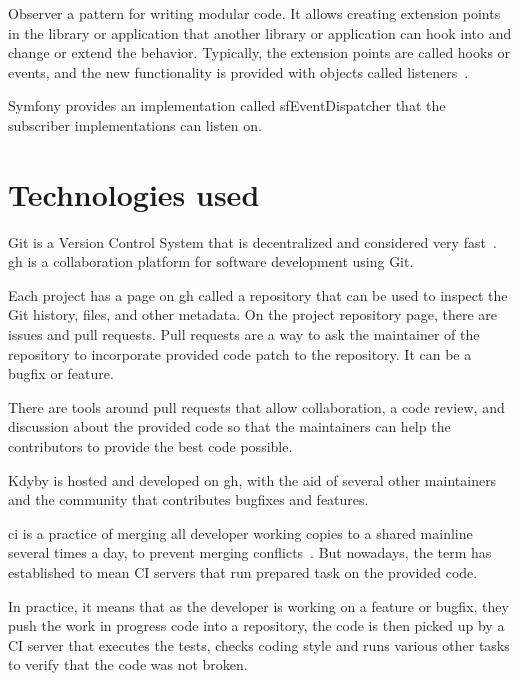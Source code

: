  \label{sec:theory:observer-pattern}

Observer a pattern for writing modular code. It allows creating extension points in the library or application that another library or application can hook into and change or extend the behavior. Typically, the extension points are called hooks or events, and the new functionality is provided with objects called listeners~\cite{vlissides1995design}.

Symfony provides an implementation called \gls{sfEventDispatcher} that the subscriber implementations can listen on.

\section{Technologies used}

 \label{sec:theory:git}

Git is a Version Control System that is decentralized and considered very fast~\cite{progit}. \gls{gh} is a collaboration platform for software development using Git.

Each project has a page on \gls{gh} called a repository that can be used to inspect the Git history, files, and other metadata. On the project repository page, there are issues and pull requests. Pull requests are a way to ask the maintainer of the repository to incorporate provided code patch to the repository. It can be a bugfix or feature.

There are tools around pull requests that allow collaboration, a code review, and discussion about the provided code so that the maintainers can help the contributors to provide the best code possible.

Kdyby is hosted and developed on \gls{gh}, with the aid of several other maintainers and the community that contributes bugfixes and features.

 \label{sec:theory:ci}

\gls{ci} is a practice of merging all developer working copies to a shared mainline several times a day, to prevent merging conflicts~\cite{fowler2006continuous}. But nowadays, the term has established to mean CI servers that run prepared task on the provided code.

In practice, it means that as the developer is working on a feature or bugfix, they push the work in progress code into a repository, the code is then picked up by a CI server that executes the tests, checks coding style and runs various other tasks to verify that the code was not broken.

